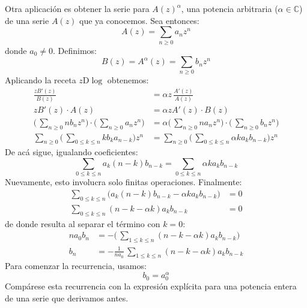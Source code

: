  Otra aplicación es obtener la serie para \(A(z)^\alpha\),%
  una potencia arbitraria
  (\(\alpha \in \mathbb{C}\))
  de una serie \(A(z)\) que ya conocemos.
  Sea entonces:
  \begin{equation*}
    A(z)
      = \sum_{n \ge 0} a_n z^n
  \end{equation*}
  donde \(a_0 \ne 0\).
  Definimos:
  \begin{equation*}
    B(z)
      = A^\alpha (z) = \sum_{n \ge 0} b_n z^n
  \end{equation*}
  Aplicando la receta \(z \mathrm{D} \log\) obtenemos:%
  \begin{align*}
    \frac{z B'(z)}{B(z)}
      &= \alpha z \, \frac{A'(z)}{A(z)} \\
    z B'(z) \cdot A(z)
      &= \alpha z A'(z) \cdot B(z) \\
    \biggl( \, \sum_{n \ge 0} n b_n z^n \biggr)
       \cdot \biggl( \, \sum_{n \ge 0} a_n z^n \biggr)
      &= \alpha \biggl( \,
		   \sum_{n \ge 0} n a_n z^n
		 \biggr)
	     \cdot \biggl( \,
		     \sum_{n \ge 0} b_n z^n
		   \biggr) \\
    \sum_{n \ge 0} \biggl( \,
		     \sum_{0 \le k \le n} k b_k a_{n - k}
		   \biggr) z^n
      &= \sum_{n \ge 0}
	   \biggl( \,
	     \sum_{0 \le k \le n} \alpha k a_k b_{n - k}
	   \biggr) z^n
  \end{align*}
  De acá sigue,
  igualando coeficientes:
  \begin{equation*}
    \sum_{0 \le k \le n} a_k (n - k) b_{n - k}
      = \sum_{0 \le k \le n} \alpha k a_k b_{n - k}
  \end{equation*}
  Nuevamente,
  esto involucra solo finitas operaciones.
  Finalmente:
  \begin{align*}
    \sum_{0 \le k \le n}
      \bigl(
	a_k (n - k) b_{n - k} - \alpha k a_k b_{n - k}
      \bigr)
      &= 0 \\
    \sum_{0 \le k \le n} (n - k - \alpha k) a_k b_{n - k}
      &= 0
  \end{align*}
  de donde resulta al separar el término con \(k = 0\):
  \begin{align*}
    n a_0 b_n
      &= -\biggl( \,
	    \sum_{1 \le k \le n} (n - k - \alpha k) a_k b_{n - k}
	  \biggr) \\
    b_n
      &= -\frac{1}{n a_0}
	  \, \sum_{1 \le k \le n} (n - k - \alpha k) a_k
    b_{n - k}
  \end{align*}
  Para comenzar la recurrencia,
  usamos:
  \begin{equation*}
    b_0 = a_0^\alpha
  \end{equation*}
  Compárese esta recurrencia con la expresión explícita
  para una potencia entera de una serie
  que derivamos antes.

